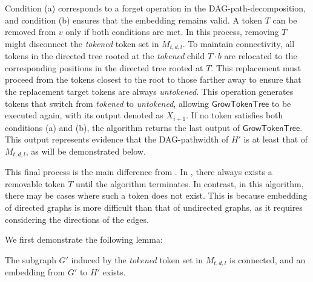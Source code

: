 \documentclass[runningheads]{llncs}
\theoremstyle{plain}
\theoremstyle{definition}
\begin{document}
Condition (a) corresponds to a forget operation in the DAG-path-decomposition, and condition (b) ensures that the embedding remains valid. A token $T$ can be removed from $v$ only if both conditions are met. In this process, removing $T$ might disconnect the \textit{tokened} token set in $M_{t, d, l}$. To maintain connectivity, all tokens in the directed tree rooted at the \textit{tokened} child $T \cdot b$ are relocated to the corresponding positions in the directed tree rooted at $T$. This replacement must proceed from the tokens closest to the root to those farther away to ensure that the replacement target tokens are always \textit{untokened}. This operation generates tokens that switch from \textit{tokened} to \textit{untokened}, allowing $\mathsf{GrowTokenTree}$ to be executed again, with its output denoted as $X_{i+1}$. If no token satisfies both conditions (a) and (b), the algorithm returns the last output of $\mathsf{GrowTokenTree}$. This output represents evidence that the DAG-pathwidth of $H'$ is at least that of $M_{t, d, l}$, as will be demonstrated below.

This final process is the main difference from \cite{art8}. In \cite{art8}, there always exists a removable token $T$ until the algorithm terminates. In contrast, in this algorithm, there may be cases where such a token does not exist. This is because embedding of directed graphs is more difficult than that of undirected graphs, as it requires considering the directions of the edges.  


We first demonstrate the following lemma:

\begin{lemma}\label{lemma_embedding}
    The subgraph $G'$ induced by the \textit{tokened} token set in $M_{t, d, l}$ is connected, and an embedding from $G'$ to $H'$ exists.
\end{lemma}
\end{document}
